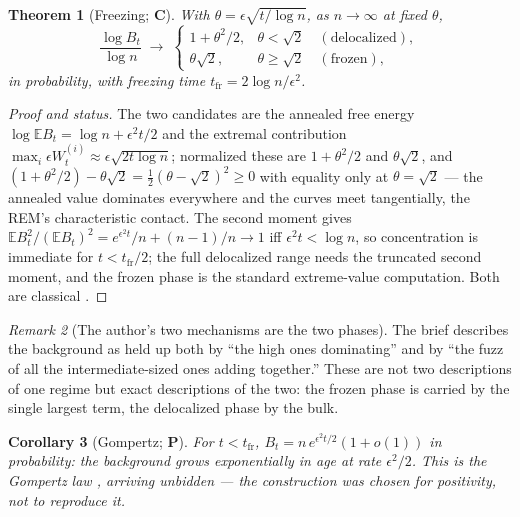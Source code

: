 \documentclass[11pt]{article}
\numberwithin{equation}{section}
\theoremstyle{plain}
\newtheorem{theorem}{Theorem}[section]
\newtheorem{corollary}[theorem]{Corollary}
\theoremstyle{definition}
\theoremstyle{remark}
\newtheorem{remark}[theorem]{Remark}
\newcommand{\E}{\mathbb{E}}
\begin{document}
\begin{theorem}[Freezing; \textbf{C}]\label{tc:thm:freezing}
With $\theta=\epsilon\sqrt{t/\log n}$, as $n\to\infty$ at fixed
$\theta$,
\begin{equation}\label{tc:eq:freezing}
\frac{\log B_t}{\log n}\;\longrightarrow\;
\begin{cases}
1+\theta^{2}/2, & \theta<\sqrt2\quad(\text{delocalized}),\\
\theta\sqrt2, & \theta\ge\sqrt2\quad(\text{frozen}),
\end{cases}
\end{equation}
in probability, with freezing time
$t_{\mathrm{fr}}=2\log n/\epsilon^{2}$.
\end{theorem}

\begin{proof}[Proof and status]
The two candidates are the annealed free energy
$\log\E B_t=\log n+\epsilon^{2}t/2$ and the extremal contribution
$\max_i\epsilon W^{(i)}_t\approx\epsilon\sqrt{2t\log n}$; normalized
these are $1+\theta^{2}/2$ and $\theta\sqrt2$, and
$(1+\theta^{2}/2)-\theta\sqrt2=\tfrac12(\theta-\sqrt2)^{2}\ge0$ with
equality only at $\theta=\sqrt2$ --- the annealed value dominates
everywhere and the curves meet tangentially, the REM's characteristic
contact. The second moment gives
$\E B_t^{2}/(\E B_t)^{2}=e^{\epsilon^{2}t}/n+(n-1)/n\to1$ iff
$\epsilon^{2}t<\log n$, so concentration is immediate for
$t<t_{\mathrm{fr}}/2$; the full delocalized range needs the truncated
second moment, and the frozen phase is the standard extreme-value
computation. Both are classical \cite{Der81,Bov06,BBM05}.
\end{proof}

\begin{remark}[The author's two mechanisms are the two phases]
\label{tc:rem:twophases}
The brief describes the background as held up both by ``the high ones
dominating'' and by ``the fuzz of all the intermediate-sized ones adding
together.'' These are not two descriptions of one regime but exact
descriptions of the two: the frozen phase is carried by the single
largest term, the delocalized phase by the bulk.
\end{remark}

\begin{corollary}[Gompertz; \textbf{P}]\label{tc:cor:gompertz}
For $t<t_{\mathrm{fr}}$, $B_t=n\,e^{\epsilon^{2}t/2}(1+o(1))$ in
probability: the background grows exponentially in age at rate
$\epsilon^{2}/2$. This is the Gompertz law \cite{Gom25}, arriving
unbidden --- the construction was chosen for positivity, not to
reproduce it.
\end{corollary}
\end{document}
